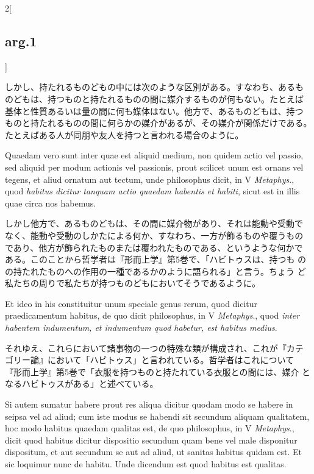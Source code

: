 \documentclass[paper=a4paper,fontsize=10pt,jafontsize=9pt,titlepage]{jlreq}
\begin{document}
\begin{paracol}{2}[\subsection{arg.1}]
\switchcolumn

しかし、持たれるものどもの中には次のような区別がある。すなわち、あるも
のどもは、持つものと持たれるものの間に媒介するものが何もない。たとえば
基体と性質あるいは量の間に何も媒体はない。他方で、あるものどもは、持つ
ものと持たれるものの間に何らかの媒介があるが、その媒介が関係だけである。
たとえばある人が同朋や友人を持つと言われる場合のように。

\switchcolumn*

Quaedam vero sunt inter quae est aliquid medium, non quidem actio vel
passio, sed aliquid per modum actionis vel passionis, prout scilicet
unum est ornans vel tegens, et aliud ornatum aut tectum, unde
philosophus dicit, in V {\itshape Metaphys}., quod {\itshape habitus
dicitur tanquam actio quaedam habentis et habiti}, sicut est in illis
quae circa nos habemus.

\switchcolumn

しかし他方で、あるものどもは、その間に媒介物があり、それは能動や受動で
なく、能動や受動のしかたによる何か、すなわち、一方が飾るものや覆うもの
であり、他方が飾られたものまたは覆われたものである、というような何かで
ある。このことから哲学者は『形而上学』第5巻で、「ハビトゥスは、持つも
のの持たれたものへの作用の一種であるかのように語られる」と言う。ちょう
ど私たちの周りで私たちが持つものどもにおいてそうであるように。

\switchcolumn*

Et ideo in his constituitur unum speciale genus rerum, quod dicitur
praedicamentum habitus, de quo dicit philosophus, in V {\itshape
Metaphys}., quod {\itshape inter habentem indumentum, et indumentum
quod habetur, est habitus medius}.

\switchcolumn

それゆえ、これらにおいて諸事物の一つの特殊な類が構成され、これが『カテ
ゴリー論』において「ハビトゥス」と言われている。哲学者はこれについて
『形而上学』第5巻で「衣服を持つものと持たれている衣服との間には、媒介
となるハビトゥスがある」と述べている。

\switchcolumn*

Si autem sumatur habere prout res aliqua dicitur quodam modo se habere
in seipsa vel ad aliud; cum iste modus se habendi sit secundum aliquam
qualitatem, hoc modo habitus quaedam qualitas est, de quo philosophus,
in V {\itshape Metaphys}., dicit quod habitus dicitur dispositio
secundum quam bene vel male disponitur dispositum, et aut secundum se
aut ad aliud, ut sanitas habitus quidam est. Et sic loquimur nunc de
habitu. Unde dicendum est quod habitus est qualitas.


\end{paracol}
\end{document}
